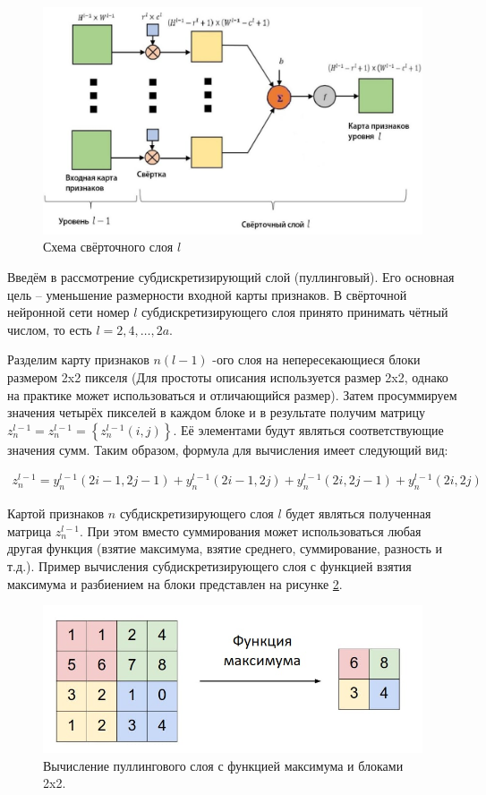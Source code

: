\begin{itemize}
\begin{itemize}
\begin{figure}[h]
\includegraphics[width=0.75\columnwidth]{./img/recur_8.jpg}
\centering
\caption{Схема свёрточного слоя $l$}
\label{pic:recur_8}
\end{figure}

Введём в рассмотрение субдискретизирующий слой (пуллинговый). Его основная цель – уменьшение размерности входной карты признаков. 
В свёрточной нейронной сети номер $l$ субдискретизирующего слоя принято принимать чётный числом, то есть $l=2,4,…,2a$.

Разделим карту признаков $n (l-1)$ -ого слоя на непересекающиеся блоки размером 2x2 пикселя 
(Для простоты описания используется размер 2x2, однако на практике может использоваться и отличающийся размер). 
Затем просуммируем значения четырёх пикселей в каждом блоке и в результате получим матрицу $z_n^{l-1} = z_n^{l-1} = \left\{ z_n^{l-1}(i,j)\right\}$. 
Её элементами будут являться соответствующие значения сумм. 
Таким образом, формула для вычисления имеет следующий вид:

\begin{equation}
  \begin{gathered}
    z_n^{l-1} = y_n^{l-1}(2i - 1,2j - 1) + y_n^{l-1}(2i - 1,2j) + y_n^{l-1}(2i,2j - 1) + y_n^{l-1}(2i,2j)
  \end{gathered}
  \label{eq:speach_formula_9}
\end{equation}

Картой признаков $n$ субдискретизирующего слоя $l$ будет являться полученная матрица $z_n^{l-1}$. 
При этом вместо суммирования может использоваться любая другая функция (взятие максимума, взятие среднего, суммирование, разность и т.д.). 
Пример вычисления субдискретизирующего слоя с функцией взятия максимума и разбиением на блоки представлен на рисунке \ref{pic:recur_9}.

\begin{figure}[h]
\includegraphics[width=0.75\columnwidth]{./img/recur_9.jpg}
\centering
\caption{Вычисление пуллингового слоя с функцией максимума и блоками 2x2. \cite{8_recur}}
\label{pic:recur_9}
\end{figure}


\end{itemize}
\end{itemize}
